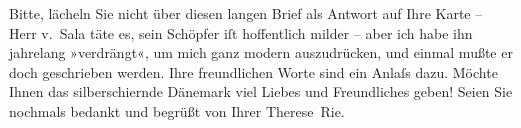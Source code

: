 \pstart
           Bitte, lächeln Sie nicht über diesen langen Brief als Antwort auf Ihre Karte – Herr v. Sala täte es, sein
               Schöpfer iſt hoffentlich milder – aber ich habe ihn jahrelang »verdrängt«, um mich
               ganz modern auszudrücken, und einmal mußte er doch geschrieben werden. Ihre
               freundlichen Worte sind ein Anlaſs dazu. Möchte Ihnen das silberschi{\geminationm}ernde Dänemark
               viel Liebes und Freundliches geben! Seien Sie nochmals bedankt und begrüßt von
               Ihrer\pend
           \pstart \spacefill\mbox{Therese Rie.}\pend{}\endnumbering{}  \newcommand{\dateiname}{L02572}\newcommand{\titel}{Therese Rie-Andro an Arthur Schnitzler, 3. 5. 1923}\newcommand{\editorInnen}{Martin Anton Müller und Gerd-Hermann Susen}
